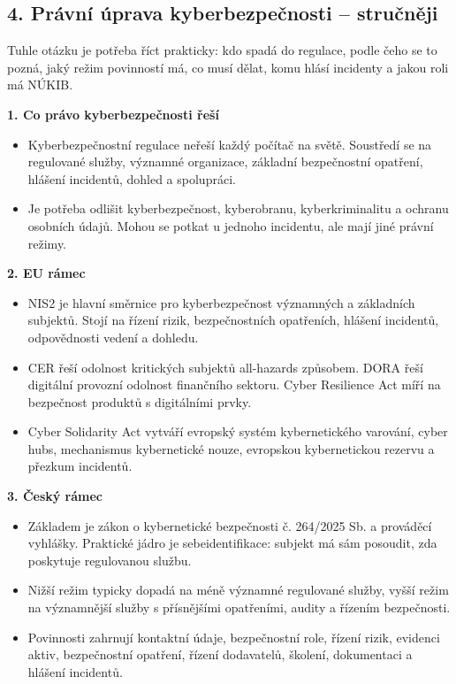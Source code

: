 
\subsection*{4. Právní úprava kyberbezpečnosti -- stručněji}
Tuhle otázku je potřeba říct prakticky: kdo spadá do regulace, podle čeho se to pozná, jaký režim povinností má, co musí dělat, komu hlásí incidenty a jakou roli má NÚKIB.

\textbf{1. Co právo kyberbezpečnosti řeší}
\begin{itemize}
  \item Kyberbezpečnostní regulace neřeší každý počítač na světě. Soustředí se na regulované služby, významné organizace, základní bezpečnostní opatření, hlášení incidentů, dohled a spolupráci.
  \item Je potřeba odlišit kyberbezpečnost, kyberobranu, kyberkriminalitu a ochranu osobních údajů. Mohou se potkat u jednoho incidentu, ale mají jiné právní režimy.
\end{itemize}

\textbf{2. EU rámec}
\begin{itemize}
  \item NIS2 je hlavní směrnice pro kyberbezpečnost významných a základních subjektů. Stojí na řízení rizik, bezpečnostních opatřeních, hlášení incidentů, odpovědnosti vedení a dohledu.
  \item CER řeší odolnost kritických subjektů all-hazards způsobem. DORA řeší digitální provozní odolnost finančního sektoru. Cyber Resilience Act míří na bezpečnost produktů s digitálními prvky.
  \item Cyber Solidarity Act vytváří evropský systém kybernetického varování, cyber hubs, mechanismus kybernetické nouze, evropskou kybernetickou rezervu a přezkum incidentů.
\end{itemize}

\textbf{3. Český rámec}
\begin{itemize}
  \item Základem je zákon o kybernetické bezpečnosti č. 264/2025 Sb. a prováděcí vyhlášky. Praktické jádro je sebeidentifikace: subjekt má sám posoudit, zda poskytuje regulovanou službu.
  \item Nižší režim typicky dopadá na méně významné regulované služby, vyšší režim na významnější služby s přísnějšími opatřeními, audity a řízením bezpečnosti.
  \item Povinnosti zahrnují kontaktní údaje, bezpečnostní role, řízení rizik, evidenci aktiv, bezpečnostní opatření, řízení dodavatelů, školení, dokumentaci a hlášení incidentů.
\end{itemize}

